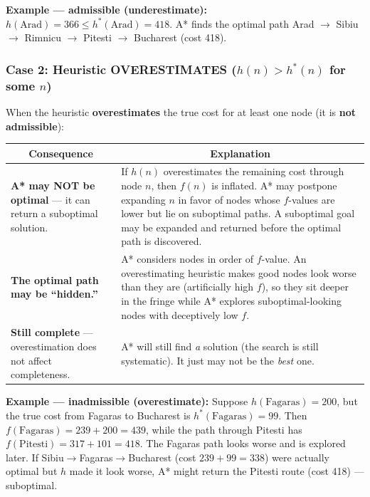 \documentclass[12pt, a4paper]{article}
\begin{document}
\vspace{0.4em}

\noindent\textbf{Example — admissible (underestimate):} $h(\text{Arad}) = 366 \leq h^*(\text{Arad}) = 418$. A* finds the optimal path Arad $\to$ Sibiu $\to$ Rimnicu $\to$ Pitesti $\to$ Bucharest (cost 418).

\subsubsection*{Case 2: Heuristic OVERESTIMATES ($h(n) > h^*(n)$ for some $n$)}

When the heuristic \textbf{overestimates} the true cost for at least one node (it is \textbf{not admissible}):

\begin{center}
\renewcommand{\arraystretch}{1.4}
\begin{tabular}{p{7cm}|p{9cm}}
\toprule
\multicolumn{1}{c|}{\textbf{Consequence}} & \multicolumn{1}{c}{\textbf{Explanation}} \\
\midrule
\textbf{A* may NOT be optimal} — it can return a suboptimal solution. &
If $h(n)$ overestimates the remaining cost through node $n$, then $f(n)$ is inflated. A* may postpone expanding $n$ in favor of nodes whose $f$-values are lower but lie on suboptimal paths. A suboptimal goal may be expanded and returned before the optimal path is discovered. \\
\midrule
\textbf{The optimal path may be ``hidden.''} &
A* considers nodes in order of $f$-value. An overestimating heuristic makes good nodes look worse than they are (artificially high $f$), so they sit deeper in the fringe while A* explores suboptimal-looking nodes with deceptively low $f$. \\
\midrule
\textbf{Still complete} — overestimation does not affect completeness. &
A* will still find \emph{a} solution (the search is still systematic). It just may not be the \emph{best} one. \\
\bottomrule
\end{tabular}
\end{center}

\vspace{0.4em}

\noindent\textbf{Example — inadmissible (overestimate):} Suppose $h(\text{Fagaras}) = 200$, but the true cost from Fagaras to Bucharest is $h^*(\text{Fagaras}) = 99$. Then $f(\text{Fagaras}) = 239 + 200 = 439$, while the path through Pitesti has $f(\text{Pitesti}) = 317 + 101 = 418$. The Fagaras path looks worse and is explored later. If Sibiu$\to$Fagaras$\to$Bucharest (cost $239+99=338$) were actually optimal but $h$ made it look worse, A* might return the Pitesti route (cost 418) — suboptimal.
\end{document}

